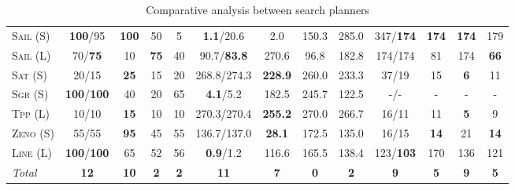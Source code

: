 \documentclass[11pt]{article}
\begin{document}
\begin{table*}[tb]
{\begin{tabular}{|l||cccc||cccc||cccc||}
\textsc{Sail} (S)&\textbf{100}/95&\textbf{100}&50&5&\textbf{1.1}/20.6&2.0&150.3&285.0&347/\textbf{174}&\textbf{174}&\textbf{174}&179\\
\textsc{Sail} (L)&70/\textbf{75}&10&\textbf{75}&40&90.7/\textbf{83.8}&270.6&96.8&182.8&174/174&81&174&\textbf{66}\\
\textsc{Sat} (S)&20/15&\textbf{25}&15&20&268.8/274.3&\textbf{228.9}&260.0&233.3&37/19&15&\textbf{6}&11\\
\textsc{Sgr} (S)&\textbf{100}/\textbf{100}&40&20&65&\textbf{4.1}/5.2&182.5&245.7&122.5&-/-&-&-&-\\
\textsc{Tpp} (L)&10/10&\textbf{15}&10&10&270.3/270.4&\textbf{255.2}&270.0&266.7&16/11&11&\textbf{5}&9\\
\textsc{Zeno} (S)&55/55&\textbf{95}&45&55&136.7/137.0&\textbf{28.1}&172.5&135.0&16/15&\textbf{14}&21&\textbf{14}\\
\textsc{Line} (L)&\textbf{100}/\textbf{100}&65&52&56&\textbf{0.9}/1.2&116.6&165.5&138.4&123/\textbf{103}&170&136&121
\\\hline
\textit{Total}&\textbf{12}&\textbf{10}&\textbf{2}&\textbf{2}&\textbf{11}&\textbf{7}&\textbf{0}&\textbf{2}&\textbf{9}&\textbf{5}&\textbf{9}&\textbf{5}\\\hline

        \end{tabular}}
        \caption{Comparative analysis between search planners}
        \label{tab:search}
        \end{table*}
        
\end{document}

